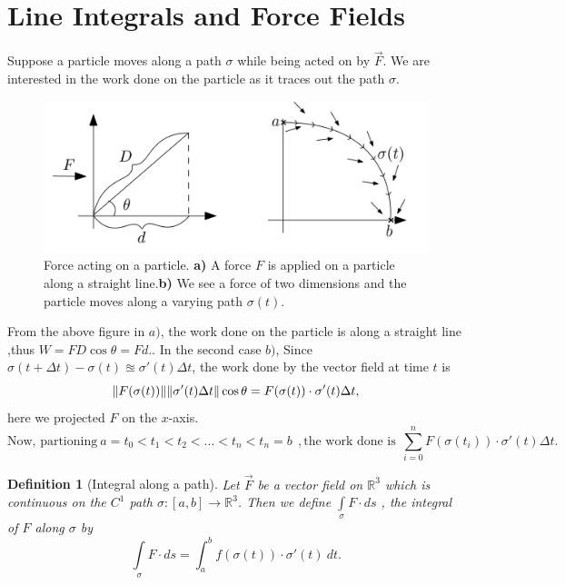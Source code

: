 \documentclass[
	12pt,
	]{article}
\newcommand{\R}{\mathbb{R}}
\DeclarePairedDelimiter{\norm}{\lVert}{\rVert}
\theoremstyle{custom}
\theoremstyle{custom}
\theoremstyle{custom}
\theoremstyle{custom}
\newtheorem{definition}{Definition}[section]
\theoremstyle{custom}
\theoremstyle{definition}
\theoremstyle{example}
\theoremstyle{note}
\theoremstyle{remark}
\theoremstyle{example}
\newcounter{theo}[section]\setcounter{theo}{0}
\numberwithin{equation}{subsection}
\begin{document}
  				\section{Line Integrals and Force Fields}
  				Suppose a particle moves along a path $\sigma$ while being acted on by $\vec{F}$. We are interested in the work done on the particle as it traces out the path $\sigma$.
  				
  				\begin{figure}[H]
  					\centering
  					\includegraphics[width = 0.8\linewidth]{MATH314_Notes_Triple_Integral_Example4_Figure.png}
  					\captionsetup{margin=1cm, justification=raggedright}\caption{Force acting on a particle. \textbf{a)} A force $F$ is applied on a particle along a straight line.\textbf{b)} We see a force of two dimensions and the particle moves along a varying path $\sigma(t)$.}
  				\end{figure}
  				From the above figure in $a)$, the work done on the particle is along a straight line ,thus $W = FD \cos \theta = Fd.$. In the second case $b)$, Since $\sigma(t + \Delta t) - \sigma(t) \approxeq \sigma'(t) \Delta t$, the work done by the vector field at time $t$ is 
  				\begin{equation}
  					\norm{F (\sigma(t))} \norm{\sigma'(t) \Delta t} \cos \theta = F(\sigma(t))\cdot \sigma'(t)\Delta t,
  				\end{equation}
  				here we projected $F$ on the $x$-axis. 
  				\begin{equation*}
  					\text{Now, partioning} \  a= t_{0} < t_{1} < t_{2} < \dots < t_{n} < t_{n} = b \ \ , \text{the work done is} \ \ \sum_{i=0}^{n} F(\sigma(t_{i})) \cdot \sigma'(t)\Delta t.
  				\end{equation*}
  				
  				\begin{definition}[Integral along a path]
  					Let $\vec{F}$ be a vector field on $\R^{3}$ which is continuous on the $C^{1}$ path $\sigma : [a,b] \to \R^{3}$. Then we define $\int\limits_{\sigma} F\cdot ds$ , the integral of $F$ along $\sigma$ by
  					\begin{equation}
  						\int\limits_{\sigma} F\cdot ds = \int_{a}^{b} f(\sigma(t))\cdot \sigma'(t) \ dt.
  					\end{equation}
  				\end{definition}
  				
\end{document}
